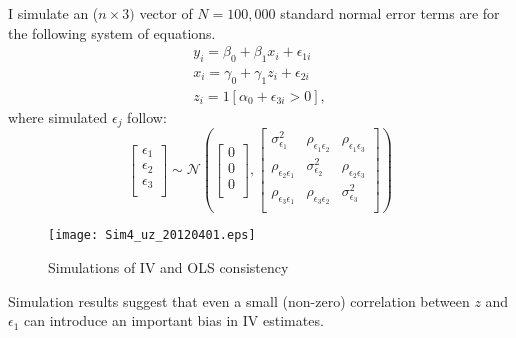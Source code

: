 \documentclass{article}[11pt,subeqn]
\begin{document}
\begin{spacing}{1.25}
I simulate an ($n \times 3)$ vector of $N=100,000$ standard normal error terms are for the following system of equations.\\
\begin{eqnarray}
\label{eqn:MC1}
y_i=\beta_0+\beta_1 x_i + \epsilon_{1i} \nonumber\\
x_i=\gamma_0 + \gamma_1 z_i + \epsilon_{2i} \nonumber\\
z_i=1[\alpha_0+\epsilon_{3i}>0], \nonumber
\end{eqnarray} 
where simulated $\epsilon_j$ follow:
\begin{equation}
\begin{bmatrix}
\epsilon_1\\
\epsilon_2\\
\epsilon_3\\
\end{bmatrix}
\sim \mathcal{N}
\left(\begin{bmatrix}
0\\
0\\
0\\
\end{bmatrix}
,
\begin{bmatrix}
\sigma_{\epsilon_1}^2 &  \rho_{\epsilon_1\epsilon_2} &  \rho_{\epsilon_1\epsilon_3}\\
\rho_{\epsilon_2\epsilon_1} & \sigma_{\epsilon_2}^2 &  \rho_{\epsilon_2\epsilon_3} \\
\rho_{\epsilon_3\epsilon_1}&  \rho_{\epsilon_3\epsilon_2}& \sigma_{\epsilon_3}^2 \\
\end{bmatrix}\right)
\end{equation}

\begin{figure}[!htbp]
\caption{Simulations of IV and OLS consistency}
\label{fig:MC}
\begin{center}
\vspace{-4mm}
\texttt{[image: Sim4\_uz\_20120401.eps]}
\end{center}
\end{figure}

Simulation results suggest that even a small (non-zero) correlation between $z$ and $\epsilon_1$ can introduce an important bias in IV estimates.  


\end{spacing}
\end{document}

